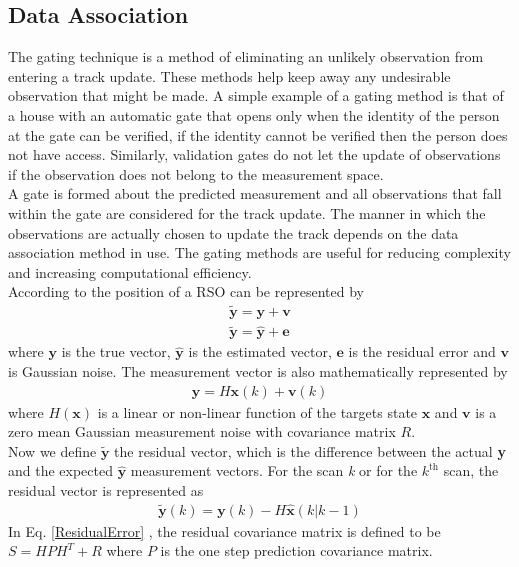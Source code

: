 \documentclass[]{aiaa-tc}%
\begin{document}
\subsection{Data Association}
The gating technique is a method of eliminating an unlikely observation from entering a track update. These methods help keep away any  undesirable observation that might be made. A simple example of a gating method is that of a house with an automatic gate that opens only when the identity of the person at the gate can be verified, if the identity cannot be verified then the person does not have access. Similarly, validation gates do not let the update of observations if the observation does not belong to the measurement space.\\

A gate is formed about the predicted measurement and all observations that fall within the gate are considered for the track update. The manner in which the observations are actually chosen to update the track depends on the data association method in use. The gating methods are useful for reducing complexity and increasing computational efficiency. \\

According to \cite{crassidis_optimal_2011} the position of a RSO can be represented by
\begin{align*}
\tilde{\textbf{y}} = \textbf{y} + \textbf{v} \\
\tilde{\textbf{y}} = \hat{\textbf{y}} + \textbf{e}
\end{align*}
where $\textbf{y}$ is the true vector, $\hat{\textbf{y}}$ is the estimated vector, $\textbf{e}$ is the residual error and $\textbf{v}$ is Gaussian noise. The measurement vector is also mathematically represented by
\begin{align}
\label{MsmtEqn}
\textbf{y} = H\textbf{x}(k) + \textbf{v}(k)
\end{align}
where $H(\textbf{x})$ is a linear or non-linear function of the targets state $\textbf{x}$ and $\textbf{v}$ is a zero mean Gaussian measurement noise with covariance matrix $R$.\\

Now we define $\tilde{\textbf{y}}$ the residual vector, which is the difference between the actual \textbf{y} and the expected $\hat{\textbf{y}}$ measurement vectors. For the scan \textit{k} or for the $k^{\text{th}}$ scan, the residual vector is represented as
\begin{align}
\label{ResidualError}
\tilde{\textbf{y}}(k) = \textbf{y}(k) - H\hat{\textbf{x}}(k|k-1) 
\end{align}
In Eq. \eqref{ResidualError} , the residual covariance matrix is defined to be $S = HPH^T + R$ where $P$ is the one step prediction covariance matrix.
\end{document}
